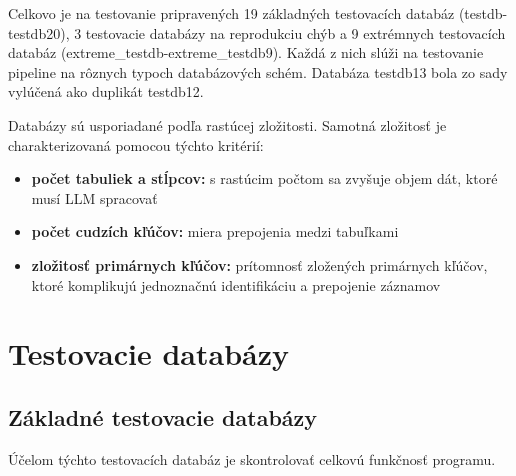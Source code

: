 Celkovo je na testovanie pripravených 19 základných testovacích databáz (testdb-testdb20), 3 testovacie databázy na reprodukciu chýb a 9 extrémnych testovacích databáz (extreme\_testdb-extreme\_testdb9). Každá z nich slúži na testovanie pipeline na rôznych typoch  databázových schém. Databáza testdb13 bola zo sady vylúčená ako duplikát testdb12.

Databázy sú usporiadané podľa rastúcej zložitosti. Samotná zložitosť je charakterizovaná pomocou týchto kritérií:
\begin{itemize}
    \item \textbf{počet tabuliek a stĺpcov:} s rastúcim počtom sa zvyšuje objem dát, ktoré musí LLM spracovať
    
    \item \textbf{počet cudzích kľúčov:} miera prepojenia medzi tabuľkami 
    
    \item \textbf{zložitosť primárnych kľúčov:} prítomnosť zložených primárnych kľúčov, ktoré komplikujú jednoznačnú identifikáciu a prepojenie záznamov

\end{itemize}


\section{Testovacie databázy}
\label{sub:testovacie_databazy}

\subsection{Základné testovacie databázy}

Účelom týchto testovacích databáz je skontrolovať celkovú funkčnosť programu.

